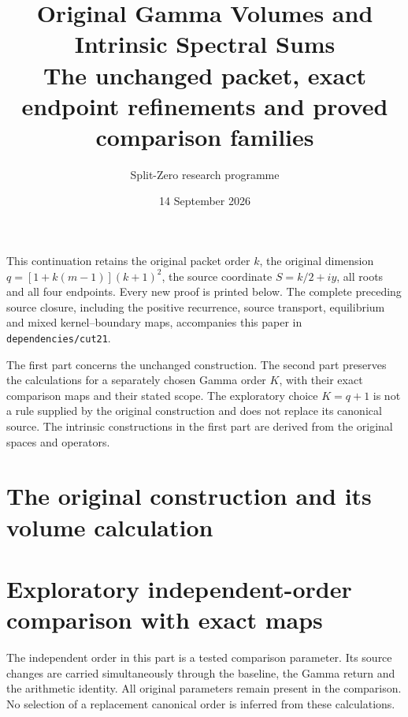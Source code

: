 \documentclass[11pt,a4paper]{article}
\title{Original Gamma Volumes and Intrinsic Spectral Sums\\[3pt]
\large The unchanged packet, exact endpoint refinements and proved comparison families}
\author{Split-Zero research programme}
\date{14 September 2026}
\begin{document}
\maketitle
This continuation retains the original packet order $k$, the original
dimension $q=[1+k(m-1)](k+1)^2$, the source coordinate $S=k/2+iy$,
all roots and all four endpoints. Every new proof is printed below.
The complete preceding source closure, including the positive recurrence,
source transport, equilibrium and mixed kernel--boundary maps, accompanies
this paper in \texttt{dependencies/cut21}.

The first part concerns the unchanged construction. The second part
preserves the calculations for a separately chosen Gamma order $K$,
with their exact comparison maps and their stated scope. The exploratory
choice $K=q+1$ is not a rule supplied by the original construction and
does not replace its canonical source. The intrinsic constructions in
the first part are derived from the original spaces and operators.

\tableofcontents
\clearpage
\part{The original construction and its volume calculation}

\clearpage

\clearpage

\clearpage

\clearpage

\clearpage

\clearpage

\clearpage

\clearpage

\clearpage


\clearpage
\part{Exploratory independent-order comparison with exact maps}
The independent order in this part is a tested comparison parameter.
Its source changes are carried simultaneously through the baseline,
the Gamma return and the arithmetic identity. All original parameters
remain present in the comparison. No selection of a replacement
canonical order is inferred from these calculations.

\clearpage

\clearpage

\clearpage

\end{document}
